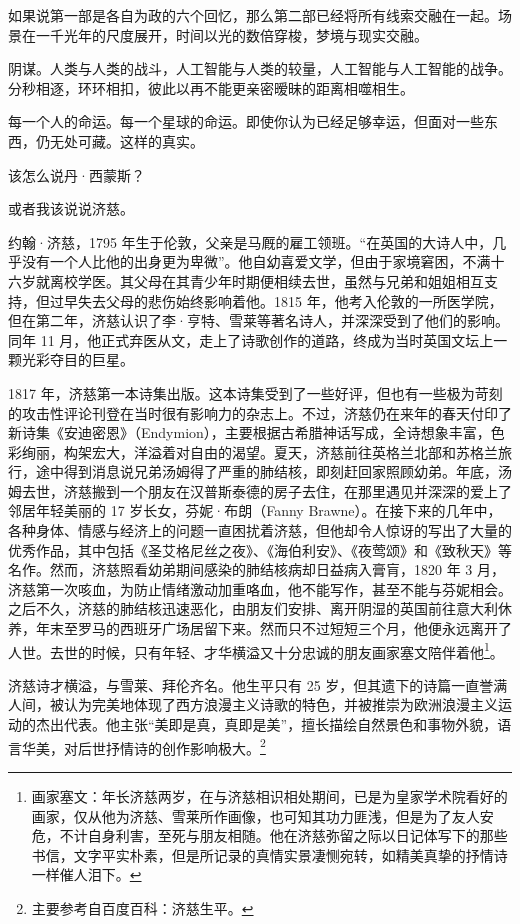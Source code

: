 \documentclass[AutoFakeBold=true]{book}
\begin{document}
如果说第一部是各自为政的六个回忆，那么第二部已经将所有线索交融在一起。场景在一千光年的尺度展开，时间以光的数倍穿梭，梦境与现实交融。

阴谋。人类与人类的战斗，人工智能与人类的较量，人工智能与人工智能的战争。分秒相逐，环环相扣，彼此以再不能更亲密暧昧的距离相噬相生。

每一个人的命运。每一个星球的命运。即使你认为已经足够幸运，但面对一些东西，仍无处可藏。这样的真实。

该怎么说丹·西蒙斯？

或者我该说说济慈。

\vspace*{1em}

约翰·济慈，1795 年生于伦敦，父亲是马厩的雇工领班。``在英国的大诗人中，几乎没有一个人比他的出身更为卑微''。他自幼喜爱文学，但由于家境窘困，不满十六岁就离校学医。其父母在其青少年时期便相续去世，虽然与兄弟和姐姐相互支持，但过早失去父母的悲伤始终影响着他。1815 年，他考入伦敦的一所医学院，但在第二年，济慈认识了李·亨特、雪莱等著名诗人，并深深受到了他们的影响。同年 11 月，他正式弃医从文，走上了诗歌创作的道路，终成为当时英国文坛上一颗光彩夺目的巨星。

1817 年，济慈第一本诗集出版。这本诗集受到了一些好评，但也有一些极为苛刻的攻击性评论刊登在当时很有影响力的杂志上。不过，济慈仍在来年的春天付印了新诗集《安迪密恩》（Endymion），主要根据古希腊神话写成，全诗想象丰富，色彩绚丽，构架宏大，洋溢着对自由的渴望。夏天，济慈前往英格兰北部和苏格兰旅行，途中得到消息说兄弟汤姆得了严重的肺结核，即刻赶回家照顾幼弟。年底，汤姆去世，济慈搬到一个朋友在汉普斯泰德的房子去住，在那里遇见并深深的爱上了邻居年轻美丽的 17 岁长女，芬妮·布朗（Fanny Brawne）。在接下来的几年中，各种身体、情感与经济上的问题一直困扰着济慈，但他却令人惊讶的写出了大量的优秀作品，其中包括《圣艾格尼丝之夜》、《海伯利安》、《夜莺颂》和《致秋天》等名作。然而，济慈照看幼弟期间感染的肺结核病却日益病入膏肓，1820 年 3 月，济慈第一次咳血，为防止情绪激动加重咯血，他不能写作，甚至不能与芬妮相会。之后不久，济慈的肺结核迅速恶化，由朋友们安排、离开阴湿的英国前往意大利休养，年末至罗马的西班牙广场居留下来。然而只不过短短三个月，他便永远离开了人世。去世的时候，只有年轻、才华横溢又十分忠诚的朋友画家塞文陪伴着他\footnote{画家塞文：年长济慈两岁，在与济慈相识相处期间，已是为皇家学术院看好的画家，仅从他为济慈、雪莱所作画像，也可知其功力匪浅，但是为了友人安危，不计自身利害，至死与朋友相随。他在济慈弥留之际以日记体写下的那些书信，文字平实朴素，但是所记录的真情实景凄恻宛转，如精美真挚的抒情诗一样催人泪下。}。

济慈诗才横溢，与雪莱、拜伦齐名。他生平只有 25 岁，但其遗下的诗篇一直誉满人间，被认为完美地体现了西方浪漫主义诗歌的特色，并被推崇为欧洲浪漫主义运动的杰出代表。他主张``美即是真，真即是美''，擅长描绘自然景色和事物外貌，语言华美，对后世抒情诗的创作影响极大。\footnote{主要参考自百度百科：济慈生平。}
\end{document}
